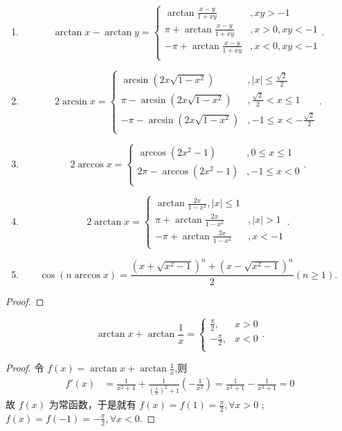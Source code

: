 \documentclass[../../main.tex]{subfiles}%
\begin{document}
\begin{theorem}[常用反三角函数性质]
\begin{enumerate}
\item $$\arctan x-\arctan y=\begin{cases}
\arctan \frac{x-y}{1+xy}&,xy>-1\\
\pi +\arctan \frac{x-y}{1+xy}&,x>0,xy<-1\\
-\pi +\arctan \frac{x-y}{1+xy}&,x<0,xy<-1\\
\end{cases}.$$

\item $$2\arcsin x=\begin{cases}
\arcsin \left( 2x\sqrt{1-x^2} \right) &,\left| x \right|\leqslant \frac{\sqrt{2}}{2}\\
\pi -\arcsin \left( 2x\sqrt{1-x^2} \right) &,\frac{\sqrt{2}}{2}<x\leqslant 1\\
-\pi -\arcsin \left( 2x\sqrt{1-x^2} \right) &,-1\leqslant x<-\frac{\sqrt{2}}{2}\\
\end{cases}.$$

\item $$2\arccos x=\begin{cases}
\arccos \left( 2x^2-1 \right) &,0\leqslant x\leqslant 1\\
2\pi -\arccos \left( 2x^2-1 \right) &,-1\leqslant x<0\\
\end{cases}.$$

\item $$2\arctan x=\begin{cases}
\arctan \frac{2x}{1-x^2},\left| x \right|\leqslant 1\\
\pi +\arctan \frac{2x}{1-x^2}&,\left| x \right|>1\\
-\pi +\arctan \frac{2x}{1-x^2}&,x<-1\\
\end{cases}.$$

\item $$\cos \left( n\arccos x \right) =\frac{\left( x+\sqrt{x^2-1} \right) ^n+\left( x-\sqrt{x^2-1} \right) ^n}{2}\left( n\geqslant 1 \right) .$$
\end{enumerate}
\end{theorem}
\begin{proof}

\end{proof}

\begin{proposition}\label{proposition:arctan相关等式}
$$\arctan x+\arctan \frac{1}{x}=\begin{cases}
\frac{\pi}{2},&x>0\\
-\frac{\pi}{2},&x<0\\
\end{cases}.$$
\end{proposition}
\begin{proof}
令 \( f(x)=\arctan x+\arctan\frac{1}{x} \),则
\begin{align*}
f'(x)&=\frac{1}{x^2 + 1}+\frac{1}{(\frac{1}{x})^2 + 1}(-\frac{1}{x^2})=\frac{1}{x^2 + 1}-\frac{1}{x^2 + 1}=0
\end{align*}
故 \( f(x) \) 为常函数，于是就有 \( f(x)=f(1)=\frac{\pi}{2},\forall x>0 \) ;\( f(x)=f(-1)=-\frac{\pi}{2},\forall x<0 \).
\end{proof}
\end{document}
